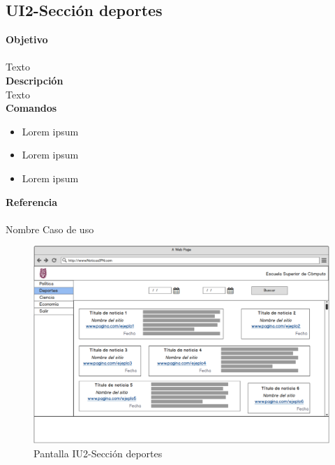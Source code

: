 \subsection{UI2-Sección deportes}

\Large{\textbf{Objetivo}}\\\\
\normalsize{Texto}\\



\Large{\textbf{Descripción}}\\
\normalsize{Texto}\\


\Large{\textbf{Comandos}}\\
\normalsize{}

\begin{itemize}
	\item Lorem ipsum
	\item Lorem ipsum
	\item Lorem ipsum
\end{itemize}

\Large{\textbf{Referencia}}\\\\
\normalsize{Nombre Caso de uso}

\begin{figure}[h]
  \centering
	\includegraphics[scale=.3]{imagenes/Pantallas/UI2}
  \caption{Pantalla IU2-Sección deportes}
  \label{fig:IU2}
\end{figure}